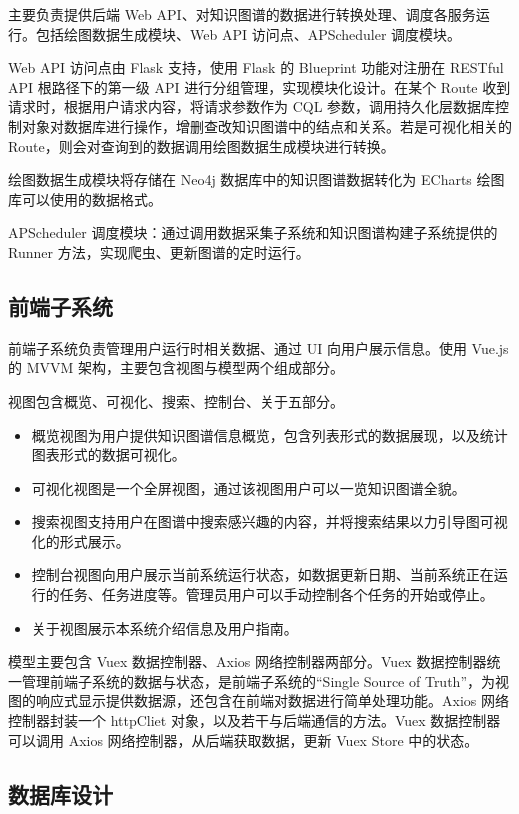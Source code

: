 \documentclass[a4paper,AutoFakeBold,oneside,12pt]{book}
\begin{document}
主要负责提供后端 Web API、对知识图谱的数据进行转换处理、调度各服务运行。包括绘图数据生成模块、Web API 访问点、APScheduler 调度模块。

Web API 访问点由 Flask 支持，使用 Flask 的 Blueprint 功能对注册在 RESTful API 根路径下的第一级 API 进行分组管理，实现模块化设计。在某个 Route 收到请求时，根据用户请求内容，将请求参数作为 CQL 参数，调用持久化层数据库控制对象对数据库进行操作，增删查改知识图谱中的结点和关系。若是可视化相关的 Route，则会对查询到的数据调用绘图数据生成模块进行转换。

绘图数据生成模块将存储在 Neo4j 数据库中的知识图谱数据转化为 ECharts 绘图库可以使用的数据格式。

APScheduler 调度模块：通过调用数据采集子系统和知识图谱构建子系统提供的 Runner 方法，实现爬虫、更新图谱的定时运行。

\subsection{前端子系统}

前端子系统负责管理用户运行时相关数据、通过 UI 向用户展示信息。使用 Vue.js 的 MVVM 架构，主要包含视图与模型两个组成部分。

视图包含概览、可视化、搜索、控制台、关于五部分。

\begin{itemize}
	\item 概览视图为用户提供知识图谱信息概览，包含列表形式的数据展现，以及统计图表形式的数据可视化。
	\item 可视化视图是一个全屏视图，通过该视图用户可以一览知识图谱全貌。
	\item 搜索视图支持用户在图谱中搜索感兴趣的内容，并将搜索结果以力引导图可视化的形式展示。
	\item 控制台视图向用户展示当前系统运行状态，如数据更新日期、当前系统正在运行的任务、任务进度等。管理员用户可以手动控制各个任务的开始或停止。
	\item 关于视图展示本系统介绍信息及用户指南。
\end{itemize}

模型主要包含 Vuex 数据控制器、Axios 网络控制器两部分。Vuex 数据控制器统一管理前端子系统的数据与状态，是前端子系统的“Single Source of Truth”，为视图的响应式显示提供数据源，还包含在前端对数据进行简单处理功能。Axios 网络控制器封装一个 httpCliet 对象，以及若干与后端通信的方法。Vuex 数据控制器可以调用 Axios 网络控制器，从后端获取数据，更新 Vuex Store 中的状态。

\subsection{数据库设计}
\end{document}
